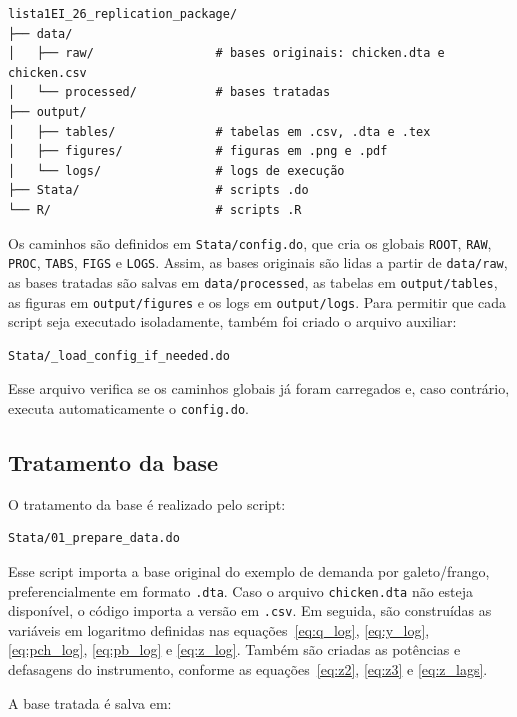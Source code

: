 \documentclass[12pt,a4paper]{article}
\begin{document}
\begin{verbatim}
lista1EI_26_replication_package/
├── data/
│   ├── raw/                 # bases originais: chicken.dta e chicken.csv
│   └── processed/           # bases tratadas
├── output/
│   ├── tables/              # tabelas em .csv, .dta e .tex
│   ├── figures/             # figuras em .png e .pdf
│   └── logs/                # logs de execução
├── Stata/                   # scripts .do
└── R/                       # scripts .R
\end{verbatim}

Os caminhos são definidos em \texttt{Stata/config.do}, que cria os globais \texttt{ROOT}, \texttt{RAW}, \texttt{PROC}, \texttt{TABS}, \texttt{FIGS} e \texttt{LOGS}. Assim, as bases originais são lidas a partir de \texttt{data/raw}, as bases tratadas são salvas em \texttt{data/processed}, as tabelas em \texttt{output/tables}, as figuras em \texttt{output/figures} e os logs em \texttt{output/logs}. Para permitir que cada script seja executado isoladamente, também foi criado o arquivo auxiliar:

\begin{verbatim}
Stata/_load_config_if_needed.do
\end{verbatim}

Esse arquivo verifica se os caminhos globais já foram carregados e, caso contrário, executa automaticamente o \texttt{config.do}.

\subsection*{Tratamento da base}

O tratamento da base é realizado pelo script:

\begin{verbatim}
Stata/01_prepare_data.do
\end{verbatim}

Esse script importa a base original do exemplo de demanda por galeto/frango, preferencialmente em formato \texttt{.dta}. Caso o arquivo \texttt{chicken.dta} não esteja disponível, o código importa a versão em \texttt{.csv}. Em seguida, são construídas as variáveis em logaritmo definidas nas equações~\eqref{eq:q_log}, \eqref{eq:y_log}, \eqref{eq:pch_log}, \eqref{eq:pb_log} e \eqref{eq:z_log}. Também são criadas as potências e defasagens do instrumento, conforme as equações~\eqref{eq:z2}, \eqref{eq:z3} e \eqref{eq:z_lags}.

A base tratada é salva em:
\end{document}
